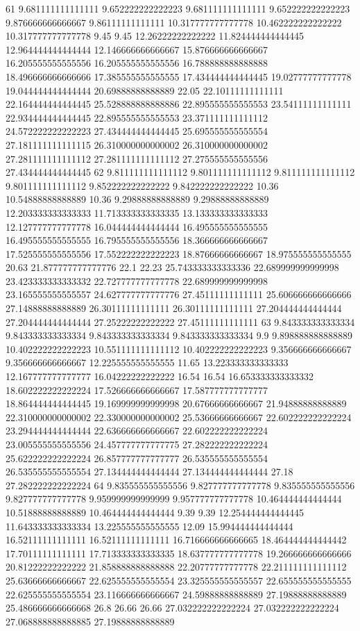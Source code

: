61 9.681111111111111 9.652222222222223 9.681111111111111 9.652222222222223 9.876666666666667 9.86111111111111 10.317777777777778 10.462222222222222 10.317777777777778 9.45 9.45 12.26222222222222 11.824444444444445 12.964444444444444 12.146666666666667 15.876666666666667 16.205555555555556 16.205555555555556 16.788888888888888 18.496666666666666 17.385555555555555 17.434444444444445 19.02777777777778 19.044444444444444 20.69888888888889 22.05 22.10111111111111 22.164444444444445 25.528888888888886 22.895555555555553 23.54111111111111 22.934444444444445 22.895555555555553 23.371111111111112 24.572222222222223 27.434444444444445 25.695555555555554 27.181111111111115 26.310000000000002 26.310000000000002 27.281111111111112 27.281111111111112 27.275555555555556 27.434444444444445
62 9.811111111111112 9.801111111111112 9.811111111111112 9.801111111111112 9.852222222222222 9.842222222222222 10.36 10.54888888888889 10.36 9.29888888888889 9.29888888888889 12.203333333333333 11.713333333333335 13.133333333333333 12.127777777777778 16.044444444444444 16.495555555555555 16.495555555555555 16.795555555555556 18.366666666666667 17.525555555555556 17.552222222222223 18.87666666666667 18.975555555555555 20.63 21.877777777777776 22.1 22.23 25.743333333333336 22.689999999999998 23.423333333333332 22.727777777777778 22.689999999999998 23.165555555555557 24.627777777777776 27.45111111111111 25.606666666666666 27.14888888888889 26.30111111111111 26.30111111111111 27.204444444444444 27.204444444444444 27.25222222222222 27.45111111111111
63 9.843333333333334 9.843333333333334 9.843333333333334 9.843333333333334 9.9 9.898888888888889 10.402222222222223 10.551111111111112 10.402222222222223 9.356666666666667 9.356666666666667 12.225555555555555 11.65 13.223333333333333 12.167777777777777 16.04222222222222 16.54 16.54 16.653333333333332 18.602222222222224 17.526666666666667 17.587777777777777 18.864444444444445 19.169999999999998 20.67666666666667 21.94888888888889 22.310000000000002 22.330000000000002 25.53666666666667 22.602222222222224 23.294444444444444 22.636666666666667 22.602222222222224 23.005555555555556 24.457777777777775 27.282222222222224 25.622222222222224 26.857777777777777 26.535555555555554 26.535555555555554 27.134444444444444 27.134444444444444 27.18 27.282222222222224
64 9.835555555555556 9.827777777777778 9.835555555555556 9.827777777777778 9.959999999999999 9.957777777777778 10.464444444444444 10.51888888888889 10.464444444444444 9.39 9.39 12.254444444444445 11.643333333333334 13.225555555555555 12.09 15.994444444444444 16.52111111111111 16.52111111111111 16.716666666666665 18.464444444444442 17.70111111111111 17.713333333333335 18.637777777777778 19.266666666666666 20.81222222222222 21.858888888888888 22.20777777777778 22.211111111111112 25.63666666666667 22.625555555555554 23.325555555555557 22.655555555555555 22.625555555555554 23.116666666666667 24.59888888888889 27.19888888888889 25.486666666666668 26.8 26.66 26.66 27.032222222222224 27.032222222222224 27.068888888888885 27.19888888888889
